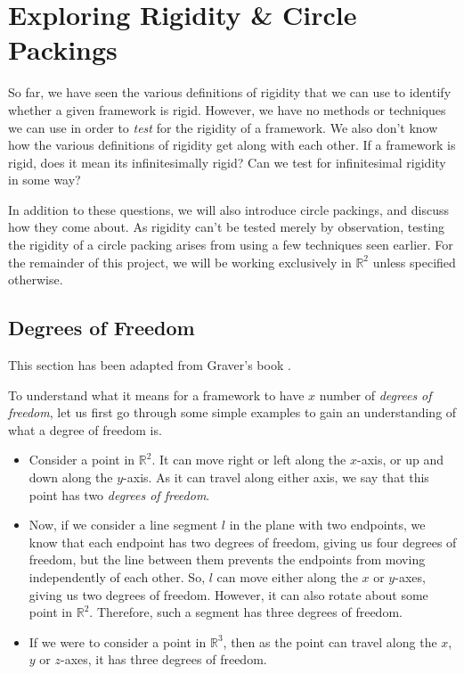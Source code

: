 \chapter{Exploring Rigidity \& Circle Packings}  %

\begin{flushleft}
So far, we have seen the various definitions of rigidity that we can use to identify whether a given framework is rigid. However, we have no methods or techniques we can use in order to \textit{test} for the rigidity of a framework. We also don't know how the various definitions of rigidity get along with each other. If a framework is rigid, does it mean its infinitesimally rigid? Can we test for infinitesimal rigidity in some way? %
\end{flushleft}

\begin{flushleft}
In addition to these questions, we will also introduce circle packings, and discuss how they come about. As rigidity can't be tested merely by observation, testing the rigidity of a circle packing arises from using a few techniques seen earlier. For the remainder of this project, we will be working exclusively in $\mathbb{R}^2$ unless specified otherwise.
\end{flushleft}

\section{Degrees of Freedom}

\noindent
This section has been adapted from Graver's book \cite{counting_frameworks}.

\begin{flushleft}
To understand what it means for a framework to have $x$ number of \textit{degrees of freedom}, let us first go through some simple examples to gain an understanding of what a degree of freedom is.

\begin{itemize}
    \item Consider a point in $\mathbb{R}^2$. It can move right or left along the $x$-axis, or up and down along the $y$-axis. As it can travel along either axis, we say that this point has two \textit{degrees of freedom}. 
    \item Now, if we consider a line segment $l$ in the plane with two endpoints, we know that each endpoint has two degrees of freedom, giving us four degrees of freedom, but the line between them prevents the endpoints from moving independently of each other. So, $l$ can move either along the $x$ or $y$-axes, giving us two degrees of freedom. However, it can also rotate about some point in $\mathbb{R}^2$. Therefore, such a segment has three degrees of freedom.
    \item If we were to consider a point in $\mathbb{R}^3$, then as the point can travel along the $x$, $y$ or $z$-axes, it has three degrees of freedom. 
\end{itemize}
\end{flushleft}

